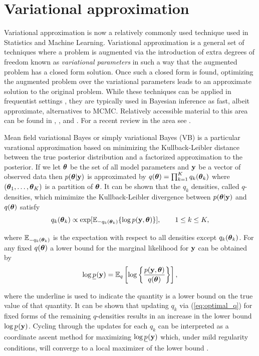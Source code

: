 \section{Variational approximation}
\label{sec:vb}

Variational approximation is now a relatively commonly used technique used in Statistics
and Machine Learning. 
Variational approximation is a general set of techniques where a problem is 
augmented via the introduction of extra degrees of freedom known as {\it variational parameters}
in such a way that the augmented problem has a closed form solution. Once such a closed form is found, optimizing the augmented
problem over the variational parameters leads to an approximate solution to the original problem. 
While these techniques can be applied in frequentist settings 
\citep{Ormerod2012}, they are typically used in Bayesian inference as fast, albeit approximate,
alternatives to MCMC. Relatively accessible material to this area can be found in
\cite{Bishop2006}, \cite{Ormerod2010}, and \cite{Grimmer2011}. For a recent
review in the area see \cite{BleiEtal2017}.

Mean field variational Bayes or simply variational Bayes (VB) is a particular 
varational approximation based on minimizing the Kullback-Leibler distance between the true posterior distribution and a factorized approximation to the posterior. If we let ${\boldsymbol \theta}$ be the set of all model parameters and ${\bf y}$ be a vector of observed data then $p({\boldsymbol \theta}|{\bf y})$ is approximated by $q({\boldsymbol \theta}) = \prod_{k=1}^K q_k({\boldsymbol \theta}_k)$ where $({\boldsymbol \theta}_1,\ldots,{\boldsymbol \theta}_K)$ is a partition of ${\boldsymbol \theta}$. It can	be shown that the 
$q_k$ densities, called $q$-densities, which mimimize the Kullback-Leibler divergence between $p({\boldsymbol \theta}|{\bf y})$ and $q({\boldsymbol \theta})$ satisfy
\begin{equation}\label{eq:optimal_q}
\displaystyle q_k({\boldsymbol \theta}_k) \propto \exp[ {\mathbb E}_{-q_k({\boldsymbol \theta}_k)} \{ \log p({\bf y},{\boldsymbol \theta}) \}], \qquad 1\le k\le K,
\end{equation}

\noindent where
${\mathbb E}_{-q_k({\boldsymbol \theta}_k)}$ is the expectation with respect to all densities except $q_k({\boldsymbol \theta}_k)$. For any fixed $q({\boldsymbol \theta})$ a lower bound for the marginal likelihood for ${\bf y}$ can be obtained by 
$$
\displaystyle \log \underline{p}_{\mbox{\scriptsize }}({\bf y}) = {\mathbb E}_q\left[ \log \left\{ \frac{p({\bf y},{\boldsymbol \theta})}{q({\boldsymbol \theta})} \right\} \right],
$$ 

\noindent where the	underline is used to indicate the quantity is a lower bound on the true value of that quantity. It can be shown that updating $q_k$ via (\ref{eq:optimal_q}) for fixed forms of the remaining $q$-densities results in an increase in the lower bound $\log \underline{p}_{\mbox{\scriptsize }}({\bf y})$. Cycling through the updates	for each $q_k$ can be interpreted as a coordinate ascent method for maximizing $\log \underline{p}_{\mbox{\scriptsize }}({\bf y})$ which, under mild regularity conditions,  will converge to a local maximizer of the lower bound \citep{LuenbergerYe2008}. 


